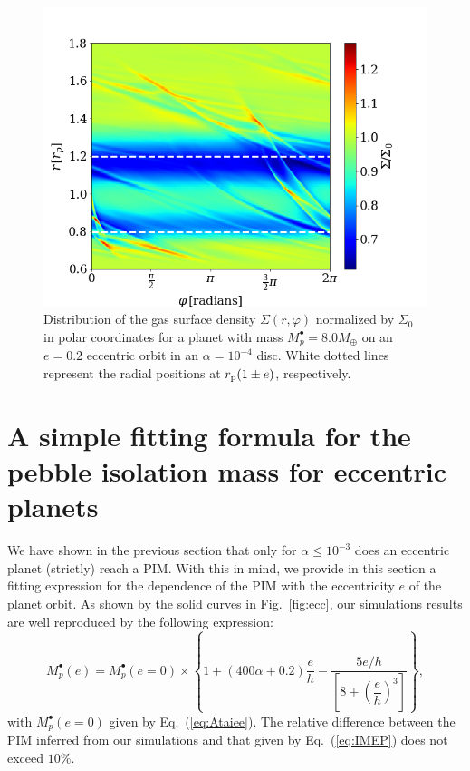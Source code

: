 \documentclass[fleqn,usenatbib]{mnras}
\begin{document}
\begin{figure}
   \includegraphics[width=1.1\linewidth]{gap_e.png}
  \caption{Distribution of the gas surface density $\Sigma(r,\varphi)$ normalized by $\Sigma_0$ in polar coordinates for a planet with mass $M_p^{\bullet}=8.0M_\oplus$ on an $e=0.2$ eccentric orbit in an $\alpha=10^{-4}$ disc. White dotted lines represent the radial positions at $r_{\rm p}(1\pm e)$, respectively.}
  \label{fig:two_gaps}
\end{figure}

\section{A simple fitting formula for the pebble isolation mass for eccentric planets}
\label{sec:fit}
We have shown in the previous section that only for $\alpha\leq10^{-3}$ does an eccentric planet (strictly) reach a PIM. With this in mind, we provide in this section a fitting expression for the dependence of the PIM with the eccentricity $e$ of the planet orbit. As shown by the solid curves in Fig.~\ref{fig:ecc}, our simulations results are well reproduced by the following expression:
\begin{equation}
M_p^{\bullet}(e) = M_p^{\bullet}(e=0) \times \left\{1 + (400\alpha+0.2)\frac{e}{h} - \frac{5e/h }{\left[8+\left(\dfrac{e}{h}\right)^3\right]}\right\},
\label{eq:IMEP}
\end{equation}
\noindent with $M_p^{\bullet}(e=0)$ given by Eq.~(\ref{eq:Ataiee}). The relative difference between the PIM inferred from our simulations and that given by Eq.~(\ref{eq:IMEP}) does not exceed $10\%$.
\end{document}
